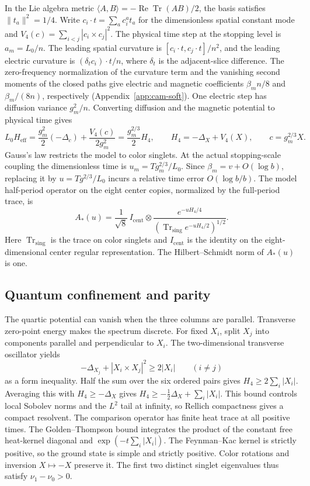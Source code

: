 \documentclass[11pt,a4paper]{article}
\numberwithin{equation}{section}
\newcommand{\Tr}{\operatorname{Tr}}
\begin{document}
In the Lie algebra metric \(\langle A,B\rangle=-\operatorname{Re}\Tr(AB)/2\), the basis satisfies \(\|t_a\|^2=1/4\). Write \(c_i\cdot t=\sum_a c_i^a t_a\) for the dimensionless spatial constant mode and \(V_4(c)=\sum_{i<j}|c_i\times c_j|^2\). The physical time step at the stopping level is \(a_m=L_0/n\). The leading spatial curvature is \([c_i\cdot t,c_j\cdot t]/n^2\), and the leading electric curvature is \((\delta_t c_i)\cdot t/n\), where \(\delta_t\) is the adjacent-slice difference. The zero-frequency normalization of the curvature term and the vanishing second moments of the closed paths give electric and magnetic coefficients \(\beta_m n/8\) and \(\beta_m/(8n)\), respectively (Appendix~\ref{app:cam-soft}). One electric step has diffusion variance \(g_m^2/n\). Converting diffusion and the magnetic potential to physical time gives
\begin{equation}
 L_0H_{\mathrm{eff}}
   = \frac{g_m^2}{2}(-\Delta_c)+\frac{V_4(c)}{2g_m^2}
   = \frac{g_m^{2/3}}{2} H_4,\qquad
 H_4=-\Delta_X+V_4(X),\qquad c=g_m^{2/3}X .
 \label{eq:model-scale}
\end{equation}
Gauss's law restricts the model to color singlets. At the actual stopping-scale coupling the dimensionless time is \(u_m=Tg_m^{2/3}/L_0\). Since \(\beta_m=v+O(\log b)\), replacing it by \(u=Tg^{2/3}/L_0\) incurs a relative time error \(O(\log b/b)\). The model half-period operator on the eight center copies, normalized by the full-period trace, is
\begin{equation}
 A_*(u)=\frac{1}{\sqrt 8}\,I_{\mathrm{cent}}\otimes
         \frac{e^{-uH_4/4}}
              {(\operatorname{Tr}_{\mathrm{sing}}e^{-uH_4/2})^{1/2}} .
 \label{eq:model-root}
\end{equation}
Here \(\operatorname{Tr}_{\mathrm{sing}}\) is the trace on color singlets and \(I_{\mathrm{cent}}\) is the identity on the eight-dimensional center regular representation. The Hilbert--Schmidt norm of \(A_*(u)\) is one.

\subsection{Quantum confinement and parity}

The quartic potential can vanish when the three columns are parallel. Transverse zero-point energy makes the spectrum discrete. For fixed \(X_i\), split \(X_j\) into components parallel and perpendicular to \(X_i\). The two-dimensional transverse oscillator yields
\[
 -\Delta_{X_j}+|X_i\times X_j|^2\ge 2|X_i|\qquad(i\ne j)
\]
as a form inequality. Half the sum over the six ordered pairs gives \(H_4\ge2\sum_i|X_i|\). Averaging this with \(H_4\ge-\Delta_X\) gives \(H_4\ge-\tfrac12\Delta_X+\sum_i|X_i|\). This bound controls local Sobolev norms and the \(L^2\) tail at infinity, so Rellich compactness gives a compact resolvent. The comparison operator has finite heat trace at all positive times. The Golden--Thompson bound integrates the product of the constant free heat-kernel diagonal and \(\exp(-t\sum_i|X_i|)\). The Feynman--Kac kernel is strictly positive, so the ground state is simple and strictly positive. Color rotations and inversion \(X\mapsto-X\) preserve it. The first two distinct singlet eigenvalues thus satisfy \(\nu_1-\nu_0>0\).
\end{document}
